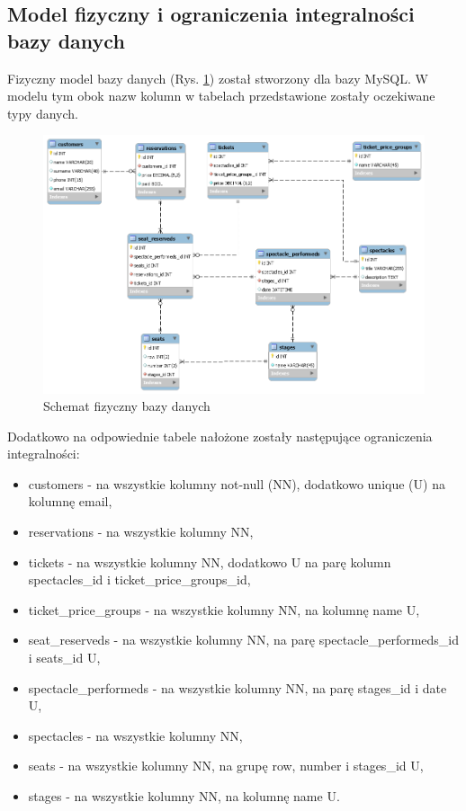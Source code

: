 \documentclass{mgr}
\begin{document}
\subsection{Model fizyczny i ograniczenia integralności bazy danych}
Fizyczny model bazy danych (Rys. \ref{fig:physical-data-model}) został stworzony dla bazy MySQL. W modelu tym obok nazw kolumn w tabelach przedstawione zostały oczekiwane typy danych.

\begin{figure}[!ht]
	\centering
	\includegraphics[width=\textwidth]{images/fizyczny.png}
	\caption{Schemat fizyczny bazy danych}
	\label{fig:physical-data-model}
\end{figure}

Dodatkowo na odpowiednie tabele nałożone zostały następujące ograniczenia integralności:
 
\begin{itemize}
	\item customers - na wszystkie kolumny not-null (NN), dodatkowo unique (U) na kolumnę email,
	\item reservations - na wszystkie kolumny NN,
	\item tickets - na wszystkie kolumny NN, dodatkowo U na parę kolumn spectacles\_id i ticket\_price\_groups\_id,
	\item ticket\_price\_groups - na wszystkie kolumny NN, na kolumnę name U,
	\item seat\_reserveds - na wszystkie kolumny NN, na parę spectacle\_performeds\_id i seats\_id U,
	\item spectacle\_performeds - na wszystkie kolumny NN, na parę stages\_id i date U,
	\item spectacles - na wszystkie kolumny NN,
	\item seats - na wszystkie kolumny NN, na grupę row, number i stages\_id U,
	\item stages - na wszystkie kolumny NN, na kolumnę name U.
	
\end{itemize}
\end{document}
